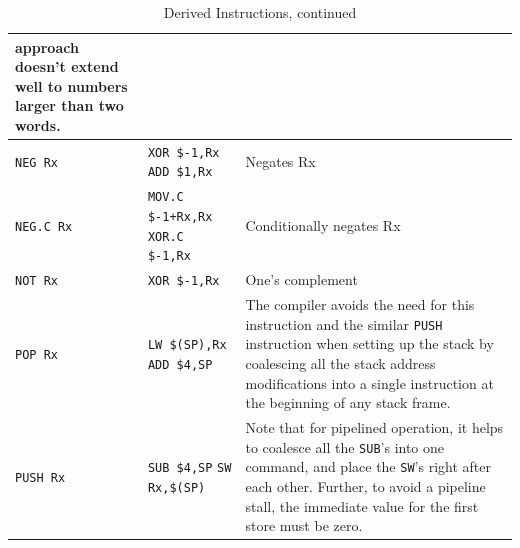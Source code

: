 \documentclass{gqtekspec}
\begin{document}
\begin{table}
\begin{center}
\begin{tabular}{p{1.1in}p{1.8in}p{3in}}
	approach doesn't extend well to numbers larger than two words. \\\hline
{\tt NEG Rx} & \parbox[t]{1.5in}{\tt XOR \$-1,Rx \\ ADD \$1,Rx} & Negates Rx\\\hline
{\tt NEG.C Rx} & \parbox[t]{1.5in}{\tt MOV.C \$-1+Rx,Rx\\XOR.C \$-1,Rx}
	& Conditionally negates Rx\\\hline
{\tt NOT Rx } & {\tt XOR \$-1,Rx } & One's complement\\\hline
{\tt POP Rx }
	& \parbox[t]{1.5in}{\tt LW \$(SP),Rx \\ ADD \$4,SP}
	& The compiler avoids the need for this instruction and the similar
	{\tt PUSH} instruction when setting up the stack by coalescing all
	the stack address modifications into a single instruction at the
	beginning of any stack frame.\\\hline
{\tt PUSH Rx}
	& \parbox[t]{1.5in}{\hbox{\tt SUB \$4,SP} 
	\hbox{\tt SW Rx,\$(SP)}}
	& Note that for pipelined operation, it helps to coalesce all the
	{\tt SUB}'s into one command, and place the {\tt SW}'s right
	after each other.  Further, to avoid a pipeline stall, the
	immediate value for the first store must be zero.
	\\\hline
\end{tabular}
\caption{Derived Instructions, continued}\label{tbl:derived-2}
\end{center}\end{table}
\end{document}
